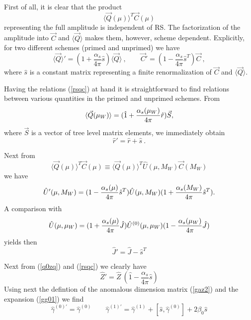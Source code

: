 \documentclass[12pt,rotate]{article}
\def\as{\alpha_s}
\def\aspi{\frac{\as}{4\pi}}
\begin{document}
\begin{itemize}
\begin{itemize}
\begin{itemize}
First of all, it is clear that the product
\begin{equation}\label{qtc}
\langle\vec Q(\mu)\rangle^T\vec C(\mu)  \end{equation}
representing the full amplitude is independent of RS. 
The factorization of the amplitude into $\vec C$ and
$\langle\vec Q\rangle$
makes them, however, scheme dependent.
Explicitly, for two different schemes
(primed and unprimed) we have
\begin{equation}\label{rsqc}
\langle\vec Q\rangle'
=(1+\aspi \hat s)\langle\vec Q\rangle~,\qquad
 \vec C'=(1-\aspi \hat s^T)\vec C~,  \end{equation}
 where $\hat s$ is a constant matrix representing a finite
renormalization of $\vec C$ and $\langle\vec Q\rangle$.

Having the relations (\ref{rsqc}) at hand it is straightforward
to find relations between various quantities in the primed and
unprimed schemes. From
\begin{equation}\label{qarsP}
\langle\vec Q(\mu_W)\rangle=(\hat 1
+{\as(\mu_W)\over 4\pi} \hat r)\vec S,  \end{equation}
where $\vec S$ is a vector of tree level matrix elements, 
we immediately obtain
\begin{equation}\label{rprs}  
\hat r'=\hat r+ \hat s~.  \end{equation}

Next from
\begin{equation}\label{qtuc} \langle\vec Q(\mu)\rangle^T\vec C(\mu)\equiv
  \langle\vec Q(\mu)\rangle^T \hat U(\mu,M_W) \vec C(M_W)  \end{equation}
we have
\begin{equation}\label{upus} \hat U'(\mu,M_W)=
(1-{\as(\mu)\over 4\pi}\hat s^T)
\hat U(\mu,M_W)(1+{\as(M_W)\over 4\pi}\hat s^T).
\end{equation}
A comparison with 
\begin{equation}\label{u1jjP}
\hat U(\mu,\mu_W)=
(1+{\as(\mu)\over 4\pi} \hat J) \hat U^{(0)}(\mu,\mu_W) 
(1-{\as(\mu_W)\over 4\pi} \hat J)
\end{equation}
 yields then
\begin{equation}\label{jpjs} \hat J'=\hat J-\hat s^T \end{equation}

Next from (\ref{q0zq}) and (\ref{rsqc}) we clearly have
\begin{equation}\label{zpzs}  \hat Z'=\hat Z~ (\hat 1- \aspi \hat s)  
\end{equation}
Using next the defintion of the anomalous dimension matrix
(\ref{gaz2}) and the expansion (\ref{gg01}) we find 
\begin{equation}\label{gpgs}
\hat \gamma^{(0)\prime}=\hat\gamma^{(0)} \qquad
 \hat\gamma^{(1)\prime}=\hat\gamma^{(1)}+[\hat s,\hat\gamma^{(0)}]+
2\beta_0 \hat s \end{equation}


\end{itemize}
\end{itemize}
\end{itemize}
\end{document}
